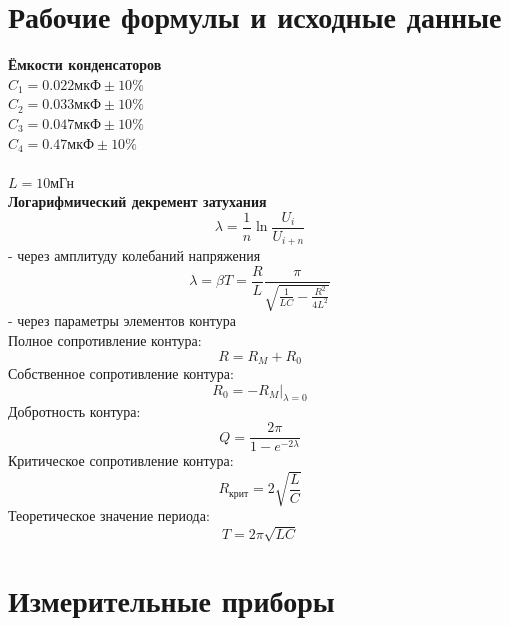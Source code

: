 \documentclass[14pt]{extarticle}
\begin{document}
    \section{Рабочие формулы и исходные данные}
    \textbf{Ёмкости конденсаторов} \\
    $C_1 = 0.022 \text{мкФ} \pm 10\%$ \\
    $C_2 = 0.033 \text{мкФ} \pm 10\%$ \\
    $C_3 = 0.047 \text{мкФ} \pm 10\%$ \\
    $C_4 = 0.47 \text{мкФ} \pm 10\%$ \\
    \vspace*{2mm} \\
    $L = 10 \text{мГн}$ \\
    \textbf{Логарифмический декремент затухания} \\
    \begin{equation*}
        \lambda = \frac{1}{n}\ln{\frac{U_i}{U_{i+n}}}
    \end{equation*}
    - через амплитуду колебаний напряжения
    \begin{equation*}
        \lambda = \beta T = \frac{R}{L}\frac{\pi}{\sqrt{\frac{1}{LC} - \frac{R^2}{4L^2}}}
    \end{equation*}
    - через параметры элементов контура\\
    Полное сопротивление контура:
    \begin{equation*}
        R = R_M + R_0
    \end{equation*}
    Собственное сопротивление контура:
    \begin{equation*}
        R_0 = -R_M|_{\lambda = 0}
    \end{equation*}
    Добротность контура:
    \begin{equation*}
        Q = \frac{2\pi}{1 - e^{-2\lambda}}
    \end{equation*}
    Критическое сопротивление контура:
    \begin{equation*}
        R_{\text{крит}} = 2\sqrt{\frac{L}{C}}
    \end{equation*}
    Теоретическое значение периода:
    \begin{equation*}
        T = 2\pi\sqrt{LC}
    \end{equation*}
    
    \newpage
    \section{Измерительные приборы}
\end{document}
